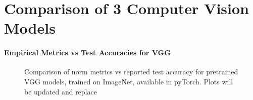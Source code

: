 \section{Comparison of 3 Computer Vision Models}
\label{sxn:cv}

\paragraph{Empirical Metrics vs Test Accuracies for VGG}

\begin{figure}[t]
    \centering
    \qquad
    \qquad
    \qquad
    \caption{Comparison of norm metrics vs reported test accuracy for pretrained VGG models, trained on ImageNet, available in pyTorch.  Plots will be updated and replace }
    

    \label{fig:vgg-metrics}
\end{figure}

